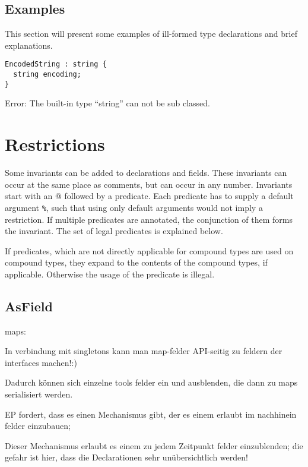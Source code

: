 \documentclass[a4paper,10pt]{article}
\begin{document}
\subsection{Examples}

This section will present some examples of ill-formed type declarations and brief explanations.

\begin{lstlisting}[label=stringExample,caption=Legal Super Types,language=skill]
EncodedString : string {
  string encoding;
}
\end{lstlisting}
Error: The built-in type ``string'' can not be sub classed.

\section{Restrictions}
Some invariants can be added to declarations and fields. These invariants can occur at the same place as comments, but can occur in any number. Invariants start with an \textsc{@} followed by a predicate. Each predicate has to supply a default argument \texttt{\%}, such that using only default arguments would not imply a restriction.
If multiple predicates are annotated, the conjunction of them forms the invariant.
The set of legal predicates is explained below.

If predicates, which are not directly applicable for compound types are used on compound types, they expand to the contents of the compound types, if applicable. Otherwise the usage of the predicate is illegal.


\subsection*{AsField}

maps:

In verbindung mit singletons kann man map-felder API-seitig zu feldern der interfaces machen!:)

Dadurch können sich einzelne tools felder ein und ausblenden, die dann zu maps serialisiert werden.

EP fordert, dass es einen Mechanismus gibt, der es einem erlaubt im nachhinein felder einzubauen;

Dieser Mechanismus erlaubt es einem zu jedem Zeitpunkt felder einzublenden; die gefahr ist hier, dass die Declarationen sehr unübersichtlich werden!
\end{document}

